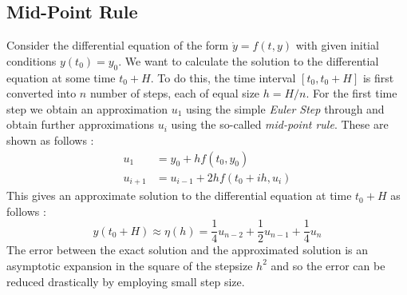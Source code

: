 \subsection{Mid-Point Rule}
Consider the differential equation of the form $\dot{y} = f(t,y)$ with given initial conditions $y(t_0) = y_0$. We want to calculate the solution to the differential equation at some time $t_0+H$. To do this, the time interval $[t_0, t_0 +H]$ is first converted into $n$ number of steps, each of equal size $h = H/n$. For the first time step we obtain an approximation $u_1$ using the simple \textit{Euler Step} through  and obtain further approximations $u_i$ using the so-called \textit{mid-point rule}. These are shown as follows \cite{gillbook}:
\begin{equation}
\begin{aligned}
u_1 &= y_0 + h f(t_0, y_0) \\
u_{i+1} &= u_{i-1} + 2h f(t_0+ih, u_i)
\end{aligned}
\end{equation}
%
This gives an approximate solution to the differential equation at time $t_0 + H$ as follows \cite{gillbook}:
\begin{equation}
y(t_0 + H) \approx \eta(h) = \frac{1}{4}u_{n-2} + \frac{1}{2}u_{n-1} + \frac{1}{4}u_n
\end{equation}
%
The error between the exact solution and the approximated solution is an asymptotic expansion in the square of the stepsize $h^2$ and so the error can be reduced drastically by employing small step size.

